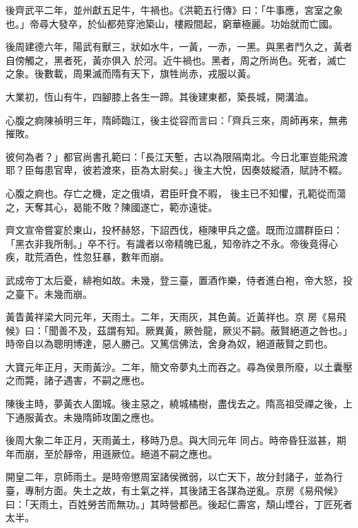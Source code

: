 \begin{pinyinscope}
 後齊武平二年，並州獻五足牛，牛禍也。《洪範五行傳》曰：「牛事應，宮室之象也。」帝尋大發卒，於仙都苑穿池築山，樓殿間起，窮華極麗。功始就而亡國。



 後周建德六年，陽武有獸三，狀如水牛，一黃，一赤，一黑。與黑者鬥久之，黃者自傍觸之，黑者死，黃亦俱入
 於河。近牛禍也。黑者，周之所尚色。死者，滅亡之象。後數載，周果滅而隋有天下，旗牲尚赤，戎服以黃。



 大業初，恆山有牛，四腳膝上各生一蹄。其後建東都，築長城，開溝洫。



 心腹之痾陳禎明三年，隋師臨江，後主從容而言曰：「齊兵三來，周師再來，無弗摧敗。



 彼何為者？」都官尚書孔範曰：「長江天塹，古以為限隔南北。今日北軍豈能飛渡耶？臣每患官卑，彼若渡來，臣為太尉矣。」後主大悅，因奏妓縱酒，賦詩不輟。



 心腹之痾也。存亡之機，定之俄頃，君臣旰食不暇，
 後主已不知懼，孔範從而蕩之，天奪其心，曷能不敗？陳國遂亡，範亦遠徙。



 齊文宣帝嘗宴於東山，投杯赫怒，下詔西伐，極陳甲兵之盛。既而泣謂群臣曰：「黑衣非我所制。」卒不行。有識者以帝精魄已亂，知帝祚之不永。帝後竟得心疾，耽荒酒色，性忽狂暴，數年而崩。



 武成帝丁太后憂，緋袍如故。未幾，登三臺，置酒作樂，侍者進白袍，帝大怒，投之臺下。未幾而崩。



 黃眚黃祥梁大同元年，天雨土。二年，天雨灰，其色黃。近黃祥也。京
 房《易飛候》曰：「聞善不及，茲謂有知。厥異黃，厥咎龍，厥災不嗣。蔽賢絕道之咎也。」時帝自以為聰明博達，惡人勝己。又篤信佛法，舍身為奴，絕道蔽賢之罰也。



 大寶元年正月，天雨黃沙。二年，簡文帝夢丸土而吞之。尋為侯景所廢，以土囊壓之而斃，諸子遇害，不嗣之應也。



 陳後主時，夢黃衣人圍城。後主惡之，繞城橘樹，盡伐去之。隋高祖受禪之後，上下通服黃衣。未幾隋師攻圍之應也。



 後周大象二年正月，天雨黃土，移時乃息。與大同元年
 同占。時帝昏狂滋甚，期年而崩，至於靜帝，用遜厥位。絕道不嗣之應也。



 開皇二年，京師雨土。是時帝懲周室諸侯微弱，以亡天下，故分封諸子，並為行臺，專制方面。失土之故，有土氣之祥，其後諸王各謀為逆亂。京房《易飛候》曰：「天雨土，百姓勞苦而無功。」其時營都邑。後起仁壽宮，頹山堙谷，丁匠死者太半。




\end{pinyinscope}
